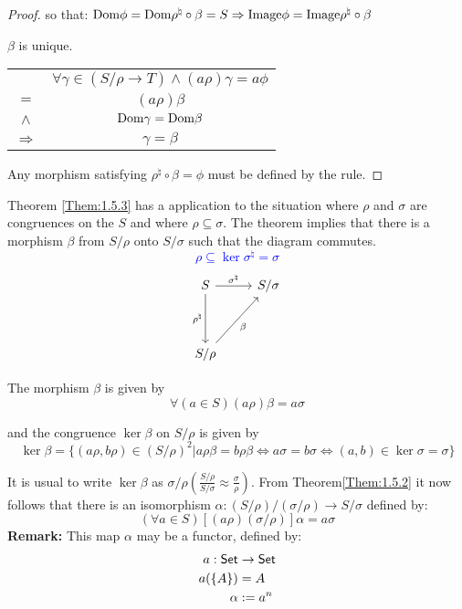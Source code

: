\begin{Them}
\begin{proof}
        so that: $\mathrm{Dom} \phi = \mathrm{Dom} \rho^{\natural} \circ \beta = S \Rightarrow \mathrm{Image} \phi = \mathrm{Image} \rho^{\natural} \circ \beta$

        $\beta$ is unique.
        \begin{center}
            \begin{tabular}{c c}
                & $\forall \gamma \in (S/\rho \rightarrow T) \wedge (a \rho)\gamma = a \phi  $ \\
                $=$ & $(a\rho)\beta$    \\
                $\wedge$ & $\mathrm{Dom} \gamma = \mathrm{Dom} \beta$   \\
                $\Rightarrow $ & $\gamma = \beta$
            \end{tabular}
        \end{center}
        
        Any morphism satisfying $\rho^{\natural} \circ \beta = \phi$ must be defined by the rule.
    \end{proof}
\end{Them}

    Theorem \ref{Them:1.5.3} has a application to the situation where $\rho$ and $\sigma$ are congruences on the $S$ and where $\rho \subseteq \sigma$. The theorem implies that there is a morphism $\beta$ from $S/\rho$ onto $S/\sigma$ such that the diagram commutes.
    \textcolor{blue}{
    \[
        \rho \subseteq \ker \sigma^{\natural} = \sigma
    \]}
\[\begin{tikzcd}
    S
    \arrow[dd, "\rho^{\natural}"']
    \arrow[r, "\sigma^{\natural}"] &
    S/\sigma    \\
    \\
    S/\rho
    \arrow[uur, "\beta"']
\end{tikzcd}\]

The morphism $\beta$ is given by
\[
    \forall (a\in S)(a\rho)\beta = a\sigma
\]

and the congruence $\ker \beta$ on $S/\rho$ is given by
\[
    \ker \beta = 
    \{  
        (a\rho,b\rho)\in (S/\rho)^2 | a\rho\beta = b\rho\beta \Leftrightarrow  a\sigma=b\sigma \Leftrightarrow (a,b)\in \ker\sigma = \sigma 
    \}
\]

It is usual to write $\ker \beta$ as $\sigma/\rho(\frac{S/\rho}{S/\sigma}\approx\frac{\sigma}{\rho})$. From Theorem\ref{Them:1.5.2} it now follows that there is an isomorphism $\alpha:(S/\rho)/(\sigma/\rho) \to S/\sigma$ defined by:
\[
    (\forall a\in S)[(a\rho)(\sigma/\rho)]\alpha = a\sigma
\]
\textbf{Remark:}
This map $\alpha$ may be a functor, defined by:
\begin{align*}
    a:\mathsf{Set} &\to \mathsf{Set} \\
    a(\{A\}) &= A  \\
    \alpha &:= a^n
\end{align*}

